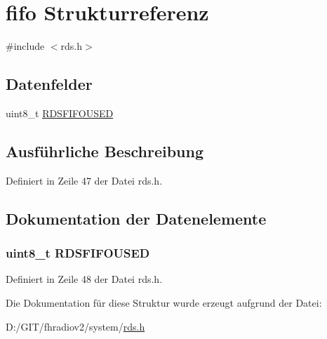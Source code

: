 \hypertarget{structfifo}{}\section{fifo Strukturreferenz}
\label{structfifo}


{\ttfamily \#include $<$rds.\+h$>$}

\subsection*{Datenfelder}
\begin{DoxyCompactItemize}
\item 
uint8\+\_\+t \hyperlink{structfifo_a8f4ac68e6765f535c5abca00d2a32a89}{R\+D\+S\+F\+I\+F\+O\+U\+S\+E\+D}
\end{DoxyCompactItemize}


\subsection{Ausführliche Beschreibung}


Definiert in Zeile 47 der Datei rds.\+h.



\subsection{Dokumentation der Datenelemente}
\hypertarget{structfifo_a8f4ac68e6765f535c5abca00d2a32a89}{}
\subsubsection[{R\+D\+S\+F\+I\+F\+O\+U\+S\+E\+D}]{\setlength{\rightskip}{0pt plus 5cm}uint8\+\_\+t R\+D\+S\+F\+I\+F\+O\+U\+S\+E\+D}\label{structfifo_a8f4ac68e6765f535c5abca00d2a32a89}


Definiert in Zeile 48 der Datei rds.\+h.



Die Dokumentation für diese Struktur wurde erzeugt aufgrund der Datei\+:\begin{DoxyCompactItemize}
\item 
D\+:/\+G\+I\+T/fhradiov2/system/\hyperlink{rds_8h}{rds.\+h}\end{DoxyCompactItemize}
